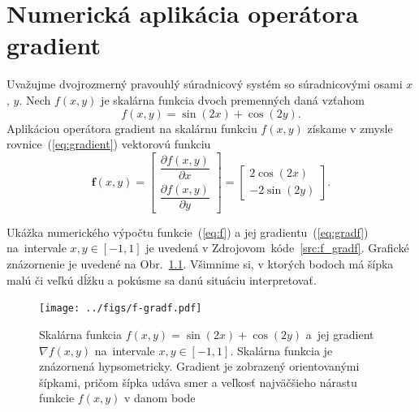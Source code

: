 \documentclass[a4paper, 12pt]{book}
\let\vec\mathbf
\begin{document}
\appendix
\chapter{Numerická aplikácia operátora gradient}
\label{app:numerical_application_of_gradient}

Uvažujme dvojrozmerný pravouhlý súradnicový systém so súradnicovými osami $x$, 
$y$.  Nech $f(x, y)$ je skalárna funkcia dvoch premenných daná vzťahom
%
\begin{equation}
\label{eq:f}
f(x, y) = \sin(2x) + \cos(2y){.}
\end{equation}
%
Aplikáciou operátora gradient na skalárnu funkciu $f(x, y)$ získame v zmysle 
rovnice~(\ref{eq:gradient}) vektorovú funkciu
%
\begin{equation}
\label{eq:gradf}
\vec f(x, y) =
\begin{bmatrix}
\dfrac{\partial f(x, y)}{\partial x} \\[2ex]
\dfrac{\partial f(x, y)}{\partial y}
\end{bmatrix}
=
\begin{bmatrix}
2 \cos(2x) \\[2ex]
-2 \sin(2y)
\end{bmatrix}
{.}
\end{equation}

Ukážka numerického výpočtu funkcie~(\ref{eq:f}) a jej 
gradientu~(\ref{eq:gradf}) na~intervale $x, y \in [-1, 1]$ je uvedená 
v Zdrojovom~kóde~\ref{src:f_gradf}.  Grafické znázornenie je uvedené na 
Obr.~\ref{fig:f_gradf}.  Všimnime si, v ktorých bodoch má šípka malú či veľkú 
dĺžku a pokúsme sa danú situáciu interpretovať.



\begin{figure}[bt]
\centering
\texttt{[image: ../figs/f-gradf.pdf]}
\caption{Skalárna funkcia $f(x, y) = \sin(2x) + \cos(2y)$ a~jej gradient 
$\nabla f(x, y)$ na~intervale $x, y \in [-1, 1]$.  Skalárna funkcia je 
znázornená hypsometricky.  Gradient je zobrazený orientovanými šípkami, pričom 
šípka udáva smer a veľkosť najväčšieho nárastu funkcie $f(x, y)$ v danom bode}
\label{fig:f_gradf}
\end{figure}




\end{document}
